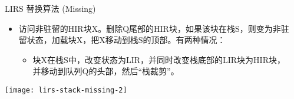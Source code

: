 \begin{frame}[plain]
	\frametitle{ }
	\begin{columns}
		\begin{column}{.1\textwidth}
			\centering
			
			
		\end{column}
		
		\begin{column}{.9\textwidth}
			LIRS 替换算法 (Missing)
			
			\begin{itemize}
				
				\item 访问非驻留的HIR块X。删除Q尾部的HIR块，如果该块在栈S，则变为非驻留状态，加载块X，把X移动到栈S的顶部。有两种情况：
				\begin{itemize}
				 \item 块X在栈S中，改变状态为LIR，并同时改变栈底部的LIR块为HIR块，并移动到队列Q的头部，然后“栈裁剪”。
					
					
				\end{itemize}
			\end{itemize}
			\centering
			\texttt{[image: lirs-stack-missing-2]}
			
		\end{column}
		
		
	\end{columns}
\end{frame}


